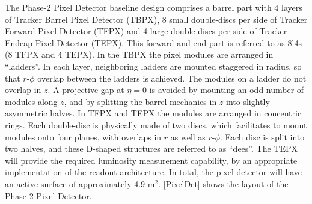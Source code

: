 The Phase-2 Pixel Detector\cite{Phase2Tracker,Phase2Tracker2} baseline design comprises a barrel part with 4 layers of Tracker Barrel Pixel Detector (TBPX), 8 small double-discs per side of Tracker Forward Pixel Detector (TFPX) and 4 large double-discs per side of Tracker Endcap Pixel Detector (TEPX). This forward and end part is referred to as 8l4s (8 TFPX and 4 TEPX). In the TBPX the pixel modules are arranged in ``ladders''. In each layer, neighboring ladders are mounted staggered in radius, so that $r$-$\phi$ overlap between the ladders is achieved. The modules on a ladder do not overlap in $z$. A projective gap at $\eta = 0$ is avoided by mounting an odd number of modules along $z$, and by splitting the barrel mechanics in $z$ into slightly asymmetric halves. In TFPX and TEPX the modules are arranged in concentric rings. Each double-disc is physically made of two discs, which facilitates to mount modules onto four planes, with overlaps in $r$ as well as $r$-$\phi$. Each disc is split into two halves, and these D-shaped structures are referred to as ``dees''. The TEPX will provide the required luminosity measurement capability, by an appropriate implementation of the readout architecture. In total, the pixel detector will have an active surface of approximately 4.9 m$^2$. \autoref{PixelDet} shows the layout of the Phase-2 Pixel Detector.





